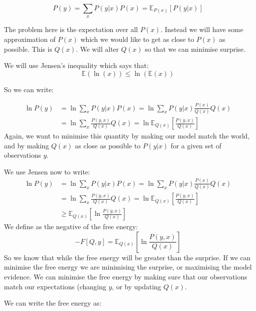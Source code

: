 \documentclass[11pt,oneside]{memoir}
\begin{document}
\begin{equation}P(y)=\sum_x P(y|x)P(x)=\mathbb{E}_{P(x)}[P(y|x)]\end{equation}

The problem here is the expectation over all $P(x)$. Instead we will have some approximation of $P(x)$ which we would like to get as close to $P(x)$ as possible. This is $Q(x)$. We will alter $Q(x)$ so that we can minimise surprise.

We will use Jensen's inequality which says that:
\begin{equation}\mathbb{E}(\ln(x))\le \ln(\mathbb{E}(x))\end{equation}

So we can write:

\begin{align}
\ln P(y)&=\ln \sum_x P(y|x)P(x)=\ln \sum_x P(y|x)\frac{P(x)}{Q(x)} Q(x)\\
&=\ln \sum_x \frac{P(y,x)}{Q(x)}Q(x)=\ln \mathbb{E}_{Q(x)}\left[\frac{P(y,x)}{Q(x)}\right]
\end{align}
Again, we want to minimise this quantity by making our model match the world, and by making $Q(x)$ as close as possible to $P(y|x)$ for a given set of observations $y$.

We use Jensen now to write:
\begin{align}
\ln P(y)&=\ln \sum_x P(y|x)P(x)=\ln \sum_x P(y|x)\frac{P(x)}{Q(x)} Q(x)\\
&=\ln \sum_x \frac{P(y,x)}{Q(x)}Q(x)=\ln \mathbb{E}_{Q(x)}\left[\frac{P(y,x)}{Q(x)}\right]\\
&\ge  \mathbb{E}_{Q(x)}\left[\ln\frac{P(y,x)}{Q(x)}\right]
\end{align}
We define as the negative of the free energy:
\begin{equation}-F[Q,y]=\mathbb{E}_{Q(x)}\left[\ln\frac{P(y,x)}{Q(x)}\right]\end{equation}
So we know that while the free energy will be greater than the surprise. If we can minimise the free energy we are minimising the surprise, or maximising the model evidence. We can minimise the free energy by making sure that our observations match our expectations (changing $y$, or by updating $Q(x)$.

We can write the free energy as:
\end{document}
